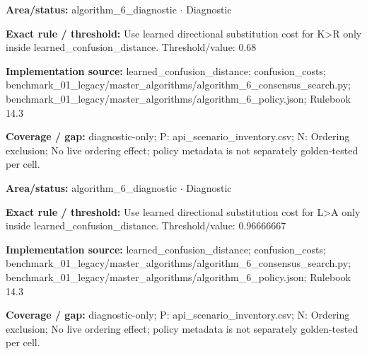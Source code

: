 \begin{tcolorbox}[enhanced,breakable,colback=white,colframe=Muted!45,boxrule=0.45pt,arc=1.5pt,left=6pt,right=6pt,top=5pt,bottom=5pt,title={\texttt{A6-LEARNED-SUBSTITUTION-K-R}},title after break={\texttt{A6-LEARNED-SUBSTITUTION-K-R}\ (continued)},fonttitle=\headingfont\bfseries\color{Navy},coltitle=Navy]
\textbf{Area/status:} algorithm\_\allowbreak{}6\_\allowbreak{}diagnostic $\boldsymbol{\cdot}$ Diagnostic\par
\smallskip
\textbf{Exact rule / threshold:} Use learned directional substitution cost for K>R only inside learned\_\allowbreak{}confusion\_\allowbreak{}distance. Threshold/\allowbreak{}value: 0.68\par
\smallskip
\textbf{Implementation source:} learned\_\allowbreak{}confusion\_\allowbreak{}distance; confusion\_\allowbreak{}costs; benchmark\_\allowbreak{}01\_\allowbreak{}legacy/\allowbreak{}master\_\allowbreak{}algorithms/\allowbreak{}algorithm\_\allowbreak{}6\_\allowbreak{}consensus\_\allowbreak{}search.py; benchmark\_\allowbreak{}01\_\allowbreak{}legacy/\allowbreak{}master\_\allowbreak{}algorithms/\allowbreak{}algorithm\_\allowbreak{}6\_\allowbreak{}policy.json; Rulebook 14.3\par
\smallskip
\textbf{Coverage / gap:} diagnostic-only; P: api\_\allowbreak{}scenario\_\allowbreak{}inventory.csv; N: Ordering exclusion; No live ordering effect; policy metadata is not separately golden-tested per cell.
\end{tcolorbox}
\begin{tcolorbox}[enhanced,breakable,colback=white,colframe=Muted!45,boxrule=0.45pt,arc=1.5pt,left=6pt,right=6pt,top=5pt,bottom=5pt,title={\texttt{A6-LEARNED-SUBSTITUTION-L-A}},title after break={\texttt{A6-LEARNED-SUBSTITUTION-L-A}\ (continued)},fonttitle=\headingfont\bfseries\color{Navy},coltitle=Navy]
\textbf{Area/status:} algorithm\_\allowbreak{}6\_\allowbreak{}diagnostic $\boldsymbol{\cdot}$ Diagnostic\par
\smallskip
\textbf{Exact rule / threshold:} Use learned directional substitution cost for L>A only inside learned\_\allowbreak{}confusion\_\allowbreak{}distance. Threshold/\allowbreak{}value: 0.96666667\par
\smallskip
\textbf{Implementation source:} learned\_\allowbreak{}confusion\_\allowbreak{}distance; confusion\_\allowbreak{}costs; benchmark\_\allowbreak{}01\_\allowbreak{}legacy/\allowbreak{}master\_\allowbreak{}algorithms/\allowbreak{}algorithm\_\allowbreak{}6\_\allowbreak{}consensus\_\allowbreak{}search.py; benchmark\_\allowbreak{}01\_\allowbreak{}legacy/\allowbreak{}master\_\allowbreak{}algorithms/\allowbreak{}algorithm\_\allowbreak{}6\_\allowbreak{}policy.json; Rulebook 14.3\par
\smallskip
\textbf{Coverage / gap:} diagnostic-only; P: api\_\allowbreak{}scenario\_\allowbreak{}inventory.csv; N: Ordering exclusion; No live ordering effect; policy metadata is not separately golden-tested per cell.
\end{tcolorbox}

